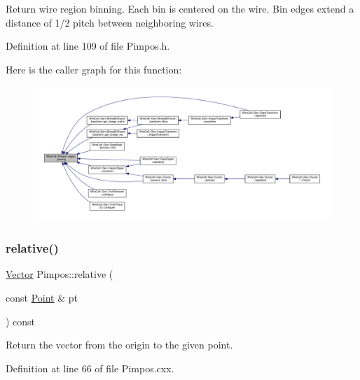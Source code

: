 Return wire region binning. Each bin is centered on the wire. Bin edges extend a distance of 1/2 pitch between neighboring wires. 

Definition at line 109 of file Pimpos.\+h.

Here is the caller graph for this function\+:
\nopagebreak
\begin{figure}[H]
\begin{center}
\leavevmode
\includegraphics[width=350pt]{class_wire_cell_1_1_pimpos_ac2d0a4ce2474237948537f0e4bd358f5_icgraph}
\end{center}
\end{figure}
\mbox{\label{class_wire_cell_1_1_pimpos_a291dda9270d9feb2a0f8afa18e4cf9e2}} 
\subsubsection{\texorpdfstring{relative()}{relative()}}
{\footnotesize\ttfamily \hyperlink{namespace_wire_cell_aa3c82d3ba85f032b0d278b7004846800}{Vector} Pimpos\+::relative (\begin{DoxyParamCaption}\item[{const \hyperlink{namespace_wire_cell_ab2b2565fa6432efbb4513c14c988cda9}{Point} \&}]{pt }\end{DoxyParamCaption}) const}



Return the vector from the origin to the given point. 



Definition at line 66 of file Pimpos.\+cxx.

